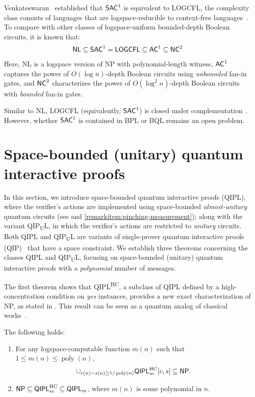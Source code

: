 \documentclass[10pt,a4paper]{article}
\numberwithin{equation}{section}
\numberwithin{figure}{section}
\newcommand{\NP}{\textnormal{\textsf{NP}}\xspace}
\newcommand{\QIP}{\textnormal{\textsf{QIP}}\xspace}
\newcommand{\QIPL}{\textnormal{\textsf{QIPL}}\xspace}
\newcommand{\QIPUL}{\texorpdfstring{\textnormal{\textsf{QIP}\textsubscript{\textnormal{U}}\textsf{L}}}\xspace}
\newcommand{\QIPLHC}{\texorpdfstring{\textnormal{\textsf{QIPL}\textsuperscript{\textnormal{HC}}}}\xspace}
\newcommand{\HC}{\mathrm{HC}}
\newcommand{\BPL}{\textnormal{\textsf{BPL}}\xspace}
\newcommand{\BQL}{\textnormal{\textsf{BQL}}\xspace}
\newcommand{\SAC}{\textnormal{\textsf{SAC}}\xspace}
\newcommand{\AC}{\textnormal{\textsf{AC}}\xspace}
\newcommand{\NC}{\textnormal{\textsf{NC}}\xspace}
\newcommand{\NL}{\textnormal{\textsf{NL}}\xspace}
\newcommand{\LOGCFL}{\textnormal{\textsf{LOGCFL}}\xspace}
\DeclareMathOperator\poly{poly}
\begin{document}
Venkateswaran~\cite{Venkateswaran87} established that $\SAC^1$ is equivalent to \LOGCFL{}, the complexity class consists of languages that are logspace-reducible to context-free languages~\cite{Sudborough78}. 
To compare with other classes of logspace-uniform bounded-depth Boolean circuits, it is known that:
\[\NL \subseteq \SAC^1 = \LOGCFL \subseteq \AC^1 \subseteq \NC^2\] 
Here, \NL{} is a logspace version of \NP{} with polynomial-length witness, $\AC^1$ captures the power of $O(\log{n})$-depth Boolean circuits using \textit{unbounded} fan-in gates, and $\NC^2$ characterizes the power of $O(\log^2{n})$-depth Boolean circuits with \textit{bounded} fan-in gates. 

Similar to \NL{}, \LOGCFL{} (equivalently, $\SAC^1$) is closed under complementation~\cite{BCD+89}. However, whether $\SAC^1$ is contained in \BPL{} or \BQL{} remains an open problem. 

\section{Space-bounded (unitary) quantum interactive proofs}
\label{sec:poly-message-QIPL}

In this section, we introduce space-bounded quantum interactive proofs (\QIPL{}), where the verifier's actions are implemented using space-bounded \textit{almost-unitary} quantum circuits (see  and \ref{remarkitem:pinching-measurement}); along with the variant \QIPUL{}, in which the verifier's actions are restricted to \textit{unitary} circuits. Both \QIPL{} and \QIPUL{} are variants of single-prover quantum interactive proofs (\QIP{})~\cite{Wat99QIP,KW00} that have a space constraint. We establish three theorems concerning the classes \QIPL{} and \QIPUL{}, focusing on space-bounded (unitary) quantum interactive proofs with a \textit{polynomial} number of messages. 

The first theorem shows that \QIPLHC{}, a subclass of \QIPL{} defined by a high-concentration condition on \textit{yes} instances, provides a new exact characterization of \NP{}, as stated in . 
This result can be seen as a quantum analog of classical works~\cite{Lipton90,CL95}. 

\begin{theorem}[The equivalence of \QIPLHC{} and \NP]
    \label{thm:QIPL-eq-NP}
    The following holds: 
    \begin{enumerate}[label={\upshape(\arabic*)}, topsep=0.33em, itemsep=0.33em, parsep=0.33em]
        \item For any logspace-computable function $m(n)$ such that $1 \leq m(n) \leq \poly(n)$,  
        \[\cup_{c(n)-s(n) \geq 1/\poly(n)}\QIPL^\HC_m[c,s] \subseteq \NP.\]
        \label{thmitem:QIPLHC-in-NP}
        \item $\NP \subseteq \QIPL^\HC_m \subseteq \QIPL_m$, where $m(n)$ is some polynomial in $n$.
    \end{enumerate}
\end{theorem}
\end{document}
